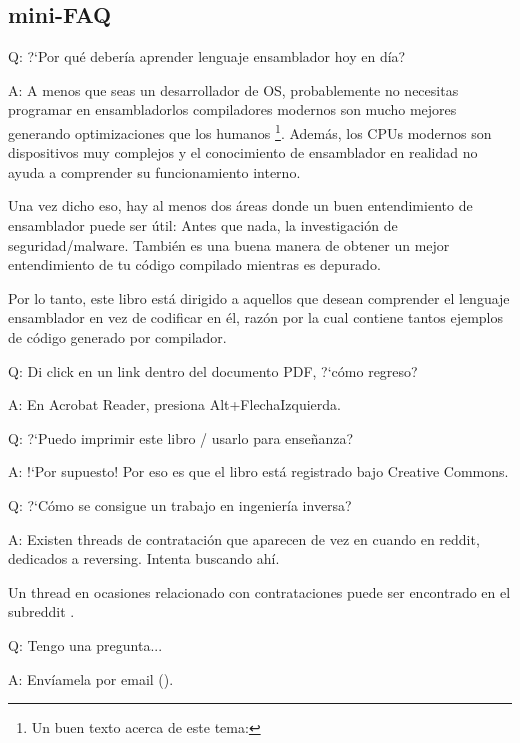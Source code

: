 \subsection*{mini-FAQ}


\par Q: ?`Por qu\'e deber\'ia aprender lenguaje ensamblador hoy en d\'ia?
\par A: A menos que seas un desarrollador de \ac{OS}, probablemente no necesitas programar en ensamblador\textemdash{}los compiladores modernos
son mucho mejores generando optimizaciones que los humanos
\footnote{Un buen texto acerca de este tema: \InSqBrackets{\AgnerFog}}.
Adem\'as, los \ac{CPU}s modernos son dispositivos muy complejos y el conocimiento de ensamblador en realidad no ayuda a comprender su funcionamiento interno.

Una vez dicho eso, hay al menos dos \'areas donde un buen entendimiento de ensamblador puede ser \'util:
Antes que nada, la investigaci\'on de seguridad/malware. Tambi\'en es una buena manera de obtener un mejor entendimiento de tu c\'odigo compilado mientras es depurado.

Por lo tanto, este libro est\'a dirigido a aquellos que desean comprender el lenguaje ensamblador en vez de codificar en \'el,
raz\'on por la cual contiene tantos ejemplos de c\'odigo generado por compilador.

\par Q: Di click en un link dentro del documento PDF, ?`c\'omo regreso?
\par A: En Acrobat Reader, presiona Alt+FlechaIzquierda.

\par Q: ?`Puedo imprimir este libro / usarlo para ense\~nanza?
\par A: !`Por supuesto! Por eso es que el libro est\'a registrado bajo Creative Commons.

\par Q: ?`C\'omo se consigue un trabajo en ingenier\'ia inversa?
\par A: Existen threads de contrataci\'on que aparecen de vez en cuando en reddit, dedicados a reversing\FNURLREDDIT{}.
Intenta buscando ah\'i.

Un thread en ocasiones relacionado con contrataciones puede ser encontrado en el subreddit .


\par Q: Tengo una pregunta...
\par A: Env\'iamela por email (\EMAIL).

